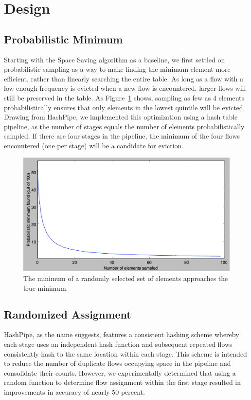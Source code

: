 \section{Design}
\label{sec:design}
\subsection{Probabilistic Minimum}
Starting with the Space Saving algorithm as a baseline, we first settled on probabilistic sampling as a way to make finding the minimum element more efficient, rather than linearly searching the entire table. As long as a flow with a low enough frequency is evicted when a new flow is encountered, larger flows will still be preserved in the table. As Figure~\ref{fig:probMin} shows, sampling as few as 4 elements probabilistically ensures that only elements in the lowest quintile will be evicted. Drawing from HashPipe, we implemented this optimization using a hash table pipeline, as the number of stages equals the number of elements probabilistically sampled. If there are four stages in the pipeline, the minimum of the four flows encountered (one per stage) will be a candidate for eviction. 
\begin{figure}[t]
  \centering
    \includegraphics[scale=0.32]{probMin}
     \caption{The minimum of a randomly selected set of elements approaches the true minimum.}
     \label{fig:probMin}
\end{figure}
\subsection{Randomized Assignment}
HashPipe, as the name suggests, features a consistent hashing scheme whereby each stage uses an independent hash function and subsequent repeated flows consistently hash to the same location within each stage. This scheme is intended to reduce the number of duplicate flows occupying space in the pipeline and consolidate their counts. However, we experimentally determined that using a random function to determine flow assignment within the first stage resulted in improvements in accuracy of nearly 50 percent.
